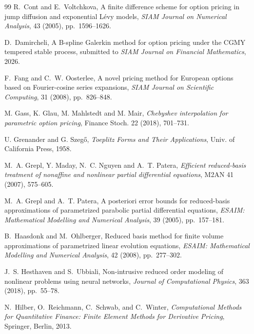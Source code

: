 \begin{thebibliography}{99}
R.~Cont and E.~Voltchkova,
\newblock A finite difference scheme for option pricing in jump diffusion and
exponential L\'evy models,
\newblock \emph{SIAM Journal on Numerical Analysis}, 43 (2005),
pp.~1596--1626.

D.~Damircheli,
\newblock A B-spline Galerkin method for option pricing under the CGMY
tempered stable process,
\newblock submitted to \emph{SIAM Journal on Financial Mathematics}, 2026.

F.~Fang and C.~W. Oosterlee,
\newblock A novel pricing method for European options based on Fourier-cosine
series expansions,
\newblock \emph{SIAM Journal on Scientific Computing}, 31 (2008),
pp.~826--848.

M. Gass, K. Glau, M. Mahlstedt and M. Mair, \emph{Chebyshev interpolation for parametric option
pricing}, Finance Stoch. 22 (2018), 701--731.

U. Grenander and G. Szeg\H{o}, \emph{Toeplitz Forms and Their Applications}, Univ. of California Press, 1958.

M.~A. Grepl, Y. Maday, N.~C. Nguyen and A.~T. Patera, \emph{Efficient reduced-basis treatment of
nonaffine and nonlinear partial differential equations}, M2AN 41 (2007), 575--605.

M.~A. Grepl and A.~T. Patera,
\newblock A posteriori error bounds for reduced-basis approximations of
parametrized parabolic partial differential equations,
\newblock \emph{ESAIM: Mathematical Modelling and Numerical Analysis},
39 (2005), pp.~157--181.

B.~Haasdonk and M.~Ohlberger,
\newblock Reduced basis method for finite volume approximations of
parametrized linear evolution equations,
\newblock \emph{ESAIM: Mathematical Modelling and Numerical Analysis},
42 (2008), pp.~277--302.

J.~S. Hesthaven and S.~Ubbiali,
\newblock Non-intrusive reduced order modeling of nonlinear problems using
neural networks,
\newblock \emph{Journal of Computational Physics}, 363 (2018), pp.~55--78.

N.~Hilber, O.~Reichmann, C.~Schwab, and C.~Winter,
\newblock \emph{Computational Methods for Quantitative Finance: Finite Element
Methods for Derivative Pricing},
\newblock Springer, Berlin, 2013.


\end{thebibliography}
